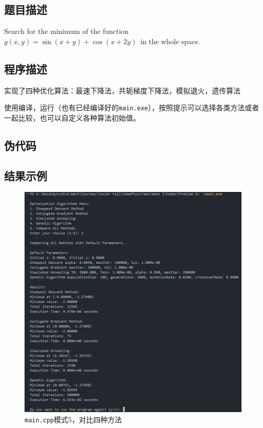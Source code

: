 \subsection{题目描述}
Search for the minimum of the function \boldmath\( g(x, y) = \sin(x + y) + \cos(x + 2y) \)\unboldmath\ in the whole space.
\subsection{程序描述}
实现了四种优化算法：最速下降法，共轭梯度下降法，模拟退火，遗传算法

使用编译，运行（也有已经编译好的\texttt{main.exe}），按照提示可以选择各类方法或者一起比较，也可以自定义各种算法初始值。
\subsection{伪代码}


\subsection{结果示例}
\begin{figure}[H]
    \centering
    \includegraphics[width=1.0\textwidth]{Figs/2_all.png}
    \caption{\texttt{main.cpp}模式5，对比四种方法}
    \label{fig:2_cpp_all}
\end{figure}
